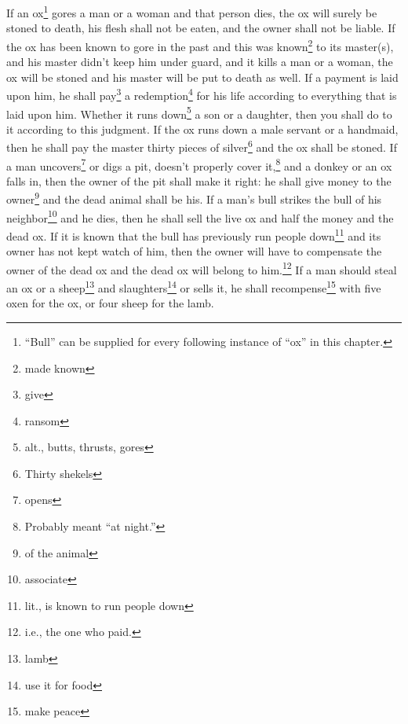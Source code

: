 \begin{inparaenum}
     If an ox\footnote{``Bull'' can be supplied for every following instance of ``ox'' in this chapter.} gores a man or a woman and that person dies, the ox will surely be stoned to death, his flesh shall not be eaten, and the owner shall not be liable.%
     If the ox has been known to gore in the past and this was known\footnote{made known} to its master(s), and his master didn't keep him under guard, and it kills a man or a woman, the ox will be stoned and his master will be put to death as well.%
     If a payment is laid upon him, he shall pay\footnote{give} a redemption\footnote{ransom} for his life according to everything that is laid upon him.%
     Whether it runs down\footnote{alt., butts, thrusts, gores} a son or a daughter, then you shall do to it according to this judgment.%
     If the ox runs down a male servant or a handmaid, then he shall pay the master thirty pieces of silver\footnote{Thirty shekels} and the ox shall be stoned.%
     If a man uncovers\footnote{opens} or digs a pit, doesn't properly cover it,\footnote{Probably meant ``at night.''} and a donkey or an ox falls in,%
     then the owner of the pit shall make it right: he shall give money to the owner\footnote{of the animal} and the dead animal shall be his.%
     If a man's bull strikes the bull of his neighbor\footnote{associate} and he dies, then he shall sell the live ox and half the money and the dead ox.%
     If it is known that the bull has previously run people down\footnote{lit., is known to run people down} and its owner has not kept watch of him, then the owner will have to compensate the owner of the dead ox and the dead ox will belong to him.\footnote{i.e., the one who paid.}%
     If a man should steal an ox or a sheep\footnote{lamb} and slaughters\footnote{use it for food} or sells it, he shall recompense\footnote{make peace} with five oxen for the ox, or four sheep for the lamb.%
\end{inparaenum}
